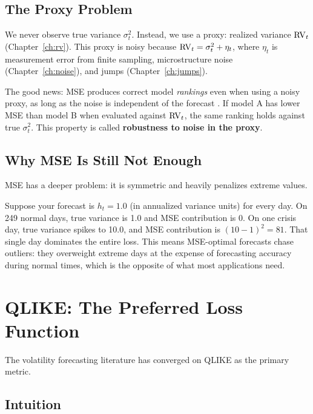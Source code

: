 \subsection{The Proxy Problem}

We never observe true variance $\sigma^2_t$.
Instead, we use a proxy: realized variance $\operatorname{RV}_t$ (Chapter~\ref{ch:rv}).
This proxy is noisy because $\operatorname{RV}_t = \sigma^2_t + \eta_t$, where $\eta_t$ is measurement error from finite sampling, microstructure noise (Chapter~\ref{ch:noise}), and jumps (Chapter~\ref{ch:jumps}).

The good news: MSE produces correct model \emph{rankings} even when using a noisy proxy, as long as the noise is independent of the forecast \citep{Patton2011}.
If model A has lower MSE than model B when evaluated against $\operatorname{RV}_t$, the same ranking holds against true $\sigma^2_t$.
This property is called \textbf{robustness to noise in the proxy}.

\subsection{Why MSE Is Still Not Enough}

MSE has a deeper problem: it is symmetric and heavily penalizes extreme values.

\begin{intuition}
Suppose your forecast is $h_t = 1.0$ (in annualized variance units) for every day.
On 249 normal days, true variance is 1.0 and MSE contribution is 0.
On one crisis day, true variance spikes to 10.0, and MSE contribution is $(10 - 1)^2 = 81$.
That single day dominates the entire loss.
This means MSE-optimal forecasts chase outliers: they overweight extreme days at the expense of forecasting accuracy during normal times, which is the opposite of what most applications need.
\end{intuition}

\section{QLIKE: The Preferred Loss Function}
\label{sec:eval-qlike}

The volatility forecasting literature has converged on QLIKE as the primary metric.

\subsection{Intuition}

